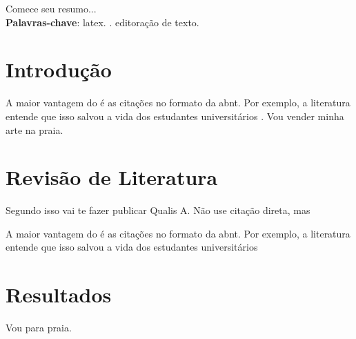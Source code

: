 \documentclass[
	article,
	12pt,
	oneside,
	a4paper,
	english,
	brazil
	]{abntex2}
\begin{document}
\maketitle



\begin{resumoumacoluna}
 Comece seu resumo... \\
 
 \textbf{Palavras-chave}: latex. \abnTeX. editoração de texto.
\end{resumoumacoluna}

\textual
\section{Introdução}

A maior vantagem do \abnTeX é as citações no formato da abnt. Por exemplo, a literatura entende que isso salvou a vida dos estudantes universitários \cite{Abreu1999}. Vou vender minha arte na praia.

\section{Revisão de Literatura}
Segundo  isso vai te fazer publicar Qualis A. Não use citação direta, mas

\begin{citacao}
A maior vantagem do \abnTeX é as citações no formato da abnt. Por exemplo, a literatura entende que isso salvou a vida dos estudantes universitários \cite{Abreu1999}
\end{citacao}


\section{Resultados}
Vou para praia.


\end{document}
